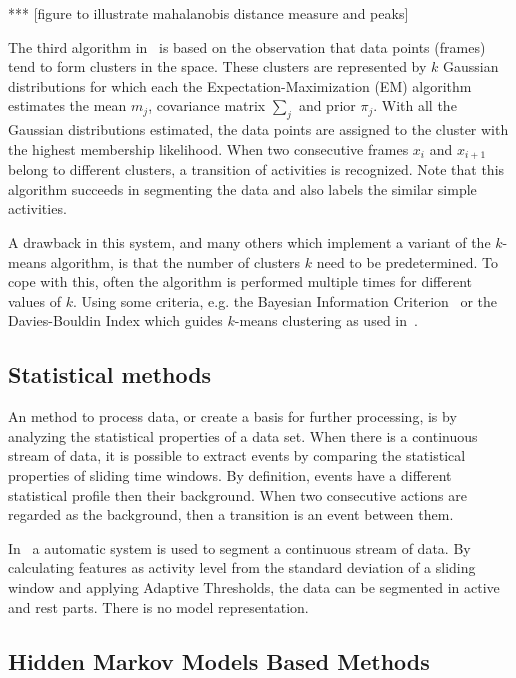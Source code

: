 *** [figure to illustrate mahalanobis distance measure and peaks]

The third algorithm in~\cite{barbivc2004segmenting} is based on the observation that data points (frames) tend to form clusters in the space.
These clusters are represented by $k$ Gaussian distributions for which each the Expectation-Maximization (EM) algorithm estimates the mean $m_j$, covariance matrix $\sum_{j}$ and prior $\pi_j$.
With all the Gaussian distributions estimated, the data points are assigned to the cluster with the highest membership likelihood.
When two consecutive frames $x_i$ and $x_{i+1}$ belong to different clusters, a transition of activities is recognized.
Note that this algorithm succeeds in segmenting the data and also labels the similar simple activities.

A drawback in this system, and many others which implement a variant of the $k$-means algorithm, is that the number of clusters $k$ need to be predetermined.
To cope with this, often the algorithm is performed multiple times for different values of $k$.
Using some criteria, e.g. the Bayesian Information Criterion~\cite{pelleg2000x} or the Davies-Bouldin Index which guides $k$-means clustering as used in~\cite{krause2003unsupervised}.

\subsection{Statistical methods}
An method to process data, or create a basis for further processing, is by analyzing the statistical properties of a data set.
When there is a continuous stream of data, it is possible to extract events by comparing the statistical properties of sliding time windows.
By definition, events have a different statistical profile then their background.
When two consecutive actions are regarded as the background, then a transition is an event between them.

In~\cite{guenterberg2009automatic} a automatic system is used to segment a continuous stream of data.
By calculating features as activity level from the standard deviation of a sliding window and applying Adaptive Thresholds, the data can be segmented in active and rest parts.
There is no model representation.

\subsection{Hidden Markov Models Based Methods}

